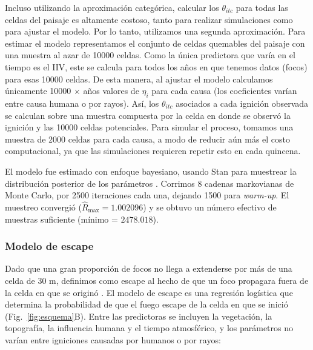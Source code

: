 Incluso utilizando la aproximación categórica, calcular los $\theta_{itc}$ para todas las celdas del paisaje es altamente costoso, tanto para realizar simulaciones como para ajustar el modelo. Por lo tanto, utilizamos una segunda aproximación. Para estimar el modelo representamos el conjunto de celdas quemables del paisaje con una muestra al azar de 10000 celdas. Como la única predictora que varía en el tiempo es el IIV, este se calcula para todos los años en que tenemos datos (focos) para esas 10000 celdas. De esta manera, al ajustar el modelo calculamos únicamente 10000 $\times$ años valores de $\eta_i$ para cada causa (los coeficientes varían entre causa humana o por rayos). Así, los $\theta_{itc}$ asociados a cada ignición observada se calculan sobre una muestra compuesta por la celda en donde se observó la ignición y las 10000 celdas potenciales. Para simular el proceso, tomamos una muestra de 2000 celdas para cada causa, a modo de reducir aún más el costo computacional, ya que las simulaciones requieren repetir esto en cada quincena. 

El modelo fue estimado con enfoque bayesiano, usando Stan para muestrear la distribución posterior de los parámetros \citep{stan_development_team_rstan_2022}. Corrimos 8 cadenas markovianas de Monte Carlo, por 2500 iteraciones cada una, dejando 1500 para \textit{warm-up}. El muestreo convergió ($\hat{R}_{\text{max}} = 1.002096$) y se obtuvo un número efectivo de muestras suficiente (mínimo = $2478.018$).

\subsubsection{Modelo de escape}

Dado que una gran proporción de focos no llega a extenderse por más de una celda de 30 m, definimos como escape al hecho de que un foco propagara fuera de la celda en que se originó \citep{marchal_turning_2020}. El modelo de escape es una regresión logística que determina la probabilidad de que el fuego escape de la celda en que se inició (Fig.~\ref{fig:esquema}B). Entre las predictoras se incluyen la vegetación, la topografía, la influencia humana y el tiempo atmosférico, y los parámetros no varían entre igniciones causadas por humanos o por rayos:

